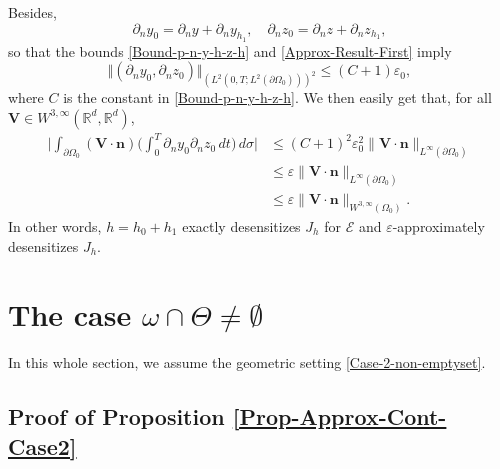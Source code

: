 \documentclass[11pt]{article}
\numberwithin{equation}{section}
\newcommand{\bn}{\boldsymbol{n}}
\newcommand{\bV}{\boldsymbol{V}}
\newcommand\R{{\mathbb R}}
\newcommand{\norm}[1]{\Vert#1\Vert}
\theoremstyle{definition}
\begin{document}
Besides,
\[
\partial_n y_0 = \partial_n y + \partial_n y_{h_1}, \quad \partial_n z_0 = \partial_n z + \partial_n z_{h_1},
\]
so that the bounds \eqref{Bound-p-n-y-h-z-h} and \eqref{Approx-Result-First} imply
\[
\norm{(\partial_n y_0, \partial_n z_0)}_{(L^2(0,T; L^2(\partial \Omega_0)))^2}
\leq
(C+1) \varepsilon_0,
\]
where $C$ is the constant in \eqref{Bound-p-n-y-h-z-h}. We then easily get that, for all $\bV \in W^{3, \infty}(\R^d, \R^d)$,
\begin{align*}
\biggl| \int_{\partial\Omega_{0}}(\bV\cdot \bn)
\biggl(\int_{0}^{T}\partial_{n}y_{0}\partial_{n} z_{0}\, dt \biggr)\,
d\sigma
\biggr|
&\leq (C+1)^2 \varepsilon_0^2 \| \bV\cdot \bn\|_{L^\infty(\partial \Omega_0)}
\\
& \leq \varepsilon \| \bV\cdot \bn\|_{L^\infty(\partial \Omega_0)}\\
& \leq \varepsilon \| \bV\cdot \bn\|_{W^{3,\infty}(\Omega_0)}.
\end{align*}
In other words, $h = h_0 + h_1$ exactly desensitizes $J_h$ for $\mathcal{E}$ and $\varepsilon$-approximately desensitizes $J_h$.

\section{The case \texorpdfstring{$\omega \cap \Theta \neq \emptyset$}{omT}}
\label{Sec-Omega-Theta-Not-Empty}

In this whole section, we assume the geometric setting \eqref{Case-2-non-emptyset}.

\subsection{Proof of Proposition \ref{Prop-Approx-Cont-Case2}}\label{Subsec-Proof-ApproxCont-Case2}
\end{document}
